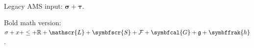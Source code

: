 \documentclass{e_class_article}
\begin{document}
Legacy AMS input: $\boldsymbol{\sigma} + \boldsymbol{\tau}$.

{
Bold math version:
$\sigma + x + \leq + \mathbb{R}
 + \mathscr{L} + \symbfscr{S}
 + \mathcal{F} + \symbfcal{G}
 + \mathfrak{g} + \symbffrak{h}$.
}
\end{document}
